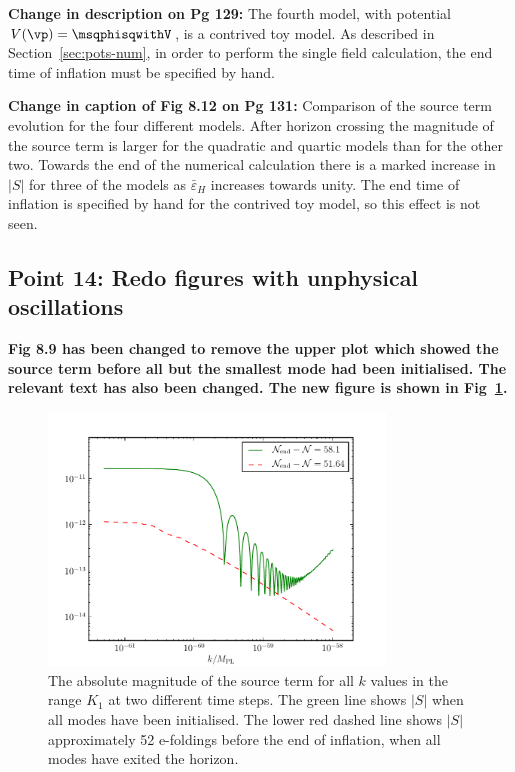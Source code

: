 \textbf{Change in description on Pg 129:}
The fourth model, with potential $V(\vp)=\msqphisqwithV$, is a contrived toy model.
As described in Section~\ref{sec:pots-num}, in order to perform the single field
calculation, the end time of inflation must be specified by hand. 

\textbf{Change in caption of Fig 8.12 on Pg 131:}
Comparison of the
source term
evolution for the four different models. After horizon crossing the magnitude of the
source term is larger for the quadratic and quartic models than for the other two.
Towards the end of the numerical calculation there is a marked increase in $|S|$ for
three of the models as $\bar{\varepsilon}_H$ increases towards unity. The end time of
inflation is specified by hand for the contrived toy model, so this effect is
not seen.

\subsection{Point 14: Redo figures with unphysical oscillations}
\textbf{Fig 8.9 has been changed to remove the upper plot which showed the source term before all
but the smallest mode had been initialised. The relevant text has also been changed. The new figure
is shown in Fig~\ref{fig:src-3ns-2}.}

\begin{figure}[htbp]
\centering
\includegraphics[width=0.8\textwidth]{numerical/graphs/src_3ns-large}
\caption[Source Term at Two Different Times]{The absolute magnitude of the source 
term for all $k$ values in the range $K_1$ at two different time steps. The green line shows
$|S|$ when all modes have been initialised. The lower red dashed line shows $|S|$ approximately 
52 e-foldings before the end of inflation, when all modes have
exited the horizon.}
\label{fig:src-3ns-2}
\end{figure}

